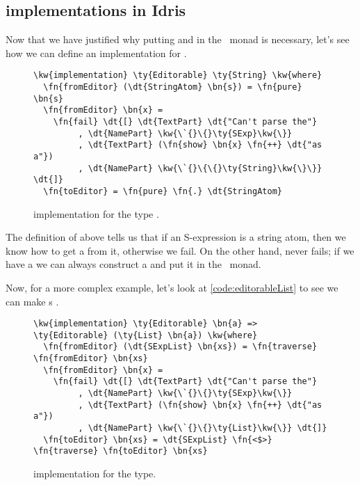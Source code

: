 \subsection{ implementations in Idris}

Now that we have justified why putting  and 
in the \Elab\ monad is necessary,
let's see how we can define an  implementation for .

\begin{figure}[H]
\caption{ implementation for the type .}
\begin{Verbatim}[framesep=2mm, label=\footnotesize{\normalfont{Idris}}, labelposition=topline]
\kw{implementation} \ty{Editorable} \ty{String} \kw{where}
  \fn{fromEditor} (\dt{StringAtom} \bn{s}) = \fn{pure} \bn{s}
  \fn{fromEditor} \bn{x} =
    \fn{fail} \dt{[} \dt{TextPart} \dt{"Can't parse the"}
         , \dt{NamePart} \kw{\`{}\{}\ty{SExp}\kw{\}}
         , \dt{TextPart} (\fn{show} \bn{x} \fn{++} \dt{"as a"})
         , \dt{NamePart} \kw{\`{}\{\{}\ty{String}\kw{\}\}} \dt{]}
  \fn{toEditor} = \fn{pure} \fn{.} \dt{StringAtom}
\end{Verbatim}
\end{figure}

The definition of  above tells us that if an S-expression is a
string atom, then we know how to get a  from it, otherwise we
fail.  On the other hand,  never fails; if we have a 
we can always construct a  and put it in the \Elab\ monad.

Now, for a more complex example, let's look at \autoref{code:editorableList} to
see we can make s .

\begin{figure}[H]
  \caption{ implementation for the  type.}
  \label{code:editorableList}
\begin{Verbatim}[framesep=2mm, label=\footnotesize{\normalfont{Idris}}, labelposition=topline]
\kw{implementation} \ty{Editorable} \bn{a} => \ty{Editorable} (\ty{List} \bn{a}) \kw{where}
  \fn{fromEditor} (\dt{SExpList} \bn{xs}) = \fn{traverse} \fn{fromEditor} \bn{xs}
  \fn{fromEditor} \bn{x} =
    \fn{fail} \dt{[} \dt{TextPart} \dt{"Can't parse the"}
         , \dt{NamePart} \kw{\`{}\{}\ty{SExp}\kw{\}}
         , \dt{TextPart} (\fn{show} \bn{x} \fn{++} \dt{"as a"})
         , \dt{NamePart} \kw{\`{}\{}\ty{List}\kw{\}} \dt{]}
  \fn{toEditor} \bn{xs} = \dt{SExpList} \fn{<$>} \fn{traverse} \fn{toEditor} \bn{xs}
\end{Verbatim}
\end{figure}

